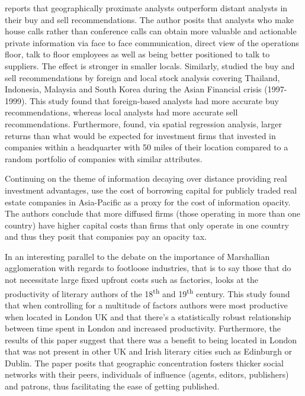\cite{malloythe2005} reports that geographically proximate analysts outperform distant analysts in their buy and sell recommendations. The author posits that analysts who make house calls rather than conference calls can obtain more valuable and actionable private information via face to face communication, direct view of the operations floor, talk to floor employees as well as being better positioned to talk to suppliers.  The effect is stronger in smaller locals.  Similarly, \cite{Farooq2013} studied the buy and sell recommendations by foreign and local stock analysis covering Thailand, Indonesia, Malaysia and South Korea during the Asian Financial crisis (1997-1999).  This study found that foreign-based analysts had more accurate buy recommendations, whereas local analysts had more accurate sell recommendations.  Furthermore, \cite{Eckel2011} found, via spatial regression analysis, larger returns than what would be expected for investment firms that invested in companies within a headquarter with 50 miles of their location compared to a random portfolio of companies with similar attributes.  
	
Continuing on the theme of information decaying over distance providing real investment advantages,	\cite{Cashman2017} use the cost of borrowing capital for publicly traded real estate companies in Asia-Pacific as a proxy for the cost of information opacity. The authors conclude that more diffused firms (those operating in more than one country) have higher capital costs than firms that only operate in one country and thus they posit that companies pay an opacity tax.   

In an interesting parallel to the debate on the importance of Marshallian agglomeration with regards to footloose industries, that is to say those that do not necessitate large fixed upfront costs such as factories, \cite{Mitchell_London_2019} looks at the productivity of literary authors of the 18\textsuperscript{th} and 19\textsuperscript{th} century. This study found that when controlling for a multitude of factors authors were most productive when located in London UK and that there's a statistically robust relationship between time spent in London and increased productivity.  Furthermore, the results of this paper suggest that there was a benefit to being located in London that was not present in other UK and Irish literary cities such as Edinburgh or Dublin.  The paper posits that geographic concentration fosters thicker social networks with their peers, individuals of influence (agents, editors, publishers) and patrons, thus facilitating the ease of getting published. 	
	
